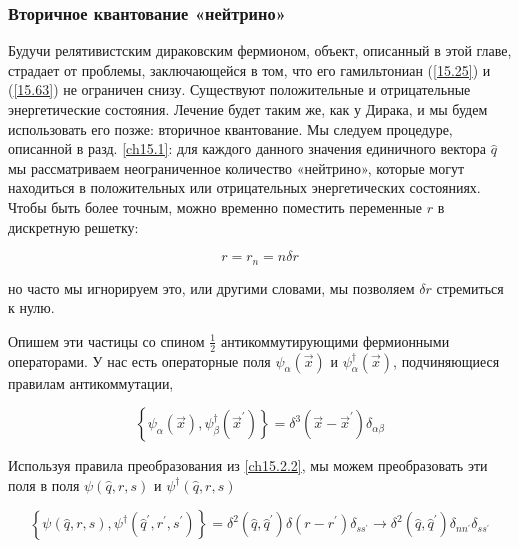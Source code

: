 \documentclass[main.tex]{subfiles}
\begin{document}
\subsubsection{Вторичное квантование «нейтрино»}\label{ch15.2.3}

Будучи релятивистским дираковским фермионом, объект, описанный в этой главе, страдает от проблемы, заключающейся в том, что его гамильтониан (\ref{15.25}) и (\ref{15.63}) не ограничен снизу. Существуют положительные и отрицательные энергетические состояния. Лечение будет таким же, как у Дирака, и мы будем использовать его позже: вторичное квантование. Мы следуем процедуре, описанной в разд. \ref{ch15.1}: для каждого данного значения единичного вектора $\hat q$ мы рассматриваем неограниченное количество «нейтрино», которые могут находиться в положительных или отрицательных энергетических состояниях. Чтобы быть более точным, можно временно поместить переменные $r$ в дискретную решетку:

\begin{equation}\label{15.84}
	r=r_{n}=n \delta r
\end{equation}


но часто мы игнорируем это, или другими словами, мы позволяем $\delta r$ стремиться к нулю.

Опишем эти частицы со спином $\frac 1 2$ антикоммутирующими фермионными операторами. У нас есть операторные поля $\psi_\alpha(\vec x)$ и $\psi^\dagger_\alpha(\vec x)$, подчиняющиеся правилам антикоммутации,                           

\begin{equation}\label{15.85}
	\left\{\psi_{\alpha}(\vec{x}), \psi_{\beta}^{\dagger}\left(\vec{x}^{\prime}\right)\right\}=\delta^{3}\left(\vec{x}-\vec{x}^{\prime}\right) \delta_{\alpha \beta}
\end{equation}
    
Используя правила преобразования из \ref{ch15.2.2}, мы можем преобразовать эти поля в поля $\psi(\hat{q}, r, s)$ и $\psi^{\dagger}\left(\hat{q}, r, s\right)$

\begin{equation}\label{15.86}
	\left\{\psi(\hat{q}, r, s), \psi^{\dagger}\left(\hat{q}^{\prime}, r^{\prime}, s^{\prime}\right)\right\}=\delta^{2}\left(\hat{q}, \hat{q}^{\prime}\right) \delta\left(r-r^{\prime}\right) \delta_{s s^{\prime}} \rightarrow \delta^{2}\left(\hat{q}, \hat{q}^{\prime}\right) \delta_{n n^{\prime}} \delta_{s s^{\prime}}
\end{equation}
\end{document}

